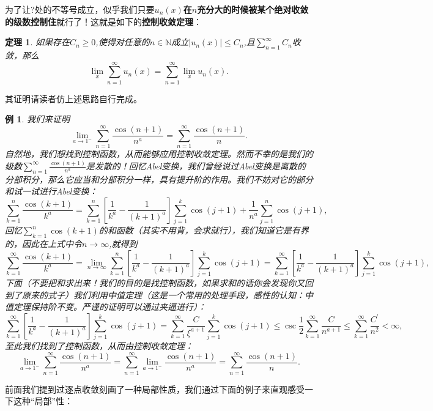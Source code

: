 \documentclass{article}
\newtheorem{theorem}{定理}[subsection]
\newtheorem{example}{例}[subsection]
\begin{document}
为了让?处的不等号成立，似乎我们只要\textbf{$u_n(x)$在$n$充分大的时候被某个绝对收敛的级数控制住}就行了！这就是如下的\textbf{控制收敛定理}：
\begin{theorem}
如果存在$C_n\ge 0$,使得对任意的$n\in\mathbb{N}$成立$|u_n(x)|\le C_n$,且$\sum_{n=1}^\infty C_n$收敛，那么
$$
\lim_x \sum_{n=1}^{\infty}{u_n\left( x \right)}=\sum_{n=1}^{\infty}{\lim_x u_n\left( x \right)}.
$$
\end{theorem}
其证明请读者仿上述思路自行完成。\par
\begin{example}
我们来证明
$$
\lim_{a\rightarrow 1^-} \sum_{n=1}^{\infty}{\frac{\cos \left( n+1 \right)}{n^a}}=\sum_{n=1}^{\infty}{\frac{\cos \left( n+1 \right)}{n}}.
$$
自然地，我们想找到控制函数，从而能够应用控制收敛定理。然而不幸的是我们的级数$\sum_{n=1}^{\infty}{\frac{\cos \left( n+1 \right)}{n^a}}$是发散的！回忆Abel变换，我们曾经说过Abel变换是离散的分部积分，那么它应当和分部积分一样，具有提升阶的作用。我们不妨对它的部分和试一试进行Abel变换：
$$
\sum_{k=1}^n{\frac{\cos \left( k+1 \right)}{k^a}}=\sum_{k=1}^n{\left[ \frac{1}{k^a}-\frac{1}{\left( k+1 \right) ^a} \right] \sum_{j=1}^k{\cos \left( j+1 \right)}}+\frac{1}{n^a}\sum_{j=1}^n{\cos \left( j+1 \right)},
$$
回忆$\sum_{k=1}^n\cos(k+1)$的和函数（其实不用背，会求就行），我们知道它是有界的，因此在上式中令$n\to\infty$,就得到
$$
\sum_{k=1}^{\infty}{\frac{\cos \left( k+1 \right)}{k^a}}=\lim_{n\rightarrow \infty} \sum_{k=1}^n{\left[ \frac{1}{k^a}-\frac{1}{\left( k+1 \right) ^a} \right] \sum_{j=1}^k{\cos \left( j+1 \right)}}=\sum_{k=1}^{\infty}{\left[ \frac{1}{k^a}-\frac{1}{\left( k+1 \right) ^a} \right] \sum_{j=1}^k{\cos \left( j+1 \right)}},
$$
下面（不要把和求出来！我们的目的是找控制函数，如果求和的话你会发现你又回到了原来的式子）我们利用中值定理（这是一个常用的处理手段，感性的认知：中值定理保持阶不变。严谨的证明可以通过夹逼进行）：
$$
\sum_{k=1}^{\infty}{\left[ \frac{1}{k^a}-\frac{1}{\left( k+1 \right) ^a} \right] \sum_{j=1}^k{\cos \left( j+1 \right)}}=\sum_{k=1}^{\infty}{\frac{C}{\xi ^{a+1}}\sum_{j=1}^k{\cos \left( j+1 \right)}}\le \csc \frac{1}{2}\sum_{k=1}^{\infty}{\frac{C}{n^{a+1}}}\le \sum_{k=1}^{\infty}{\frac{C^{\prime}}{n^2}}<\infty ,
$$
至此我们找到了控制函数，从而由控制收敛定理：
$$
\lim_{a\rightarrow 1^-} \sum_{n=1}^{\infty}{\frac{\cos \left( n+1 \right)}{n^a}}=\sum_{n=1}^{\infty}{\lim_{a\rightarrow 1^-} \frac{\cos \left( n+1 \right)}{n^a}}=\sum_{n=1}^{\infty}{\frac{\cos \left( n+1 \right)}{n}}.
$$
\end{example}
前面我们提到过逐点收敛刻画了一种局部性质，我们通过下面的例子来直观感受一下这种“局部”性：
\end{document}
